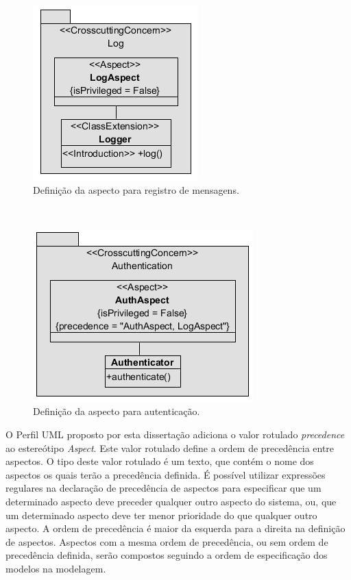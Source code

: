   \begin{figure}[!h]
	\centering
	\includegraphics{img/log_aspect.png}
	\caption{Definição da aspecto para registro de mensagens.}\label{fig:log_aspect}
  \end{figure}
  \
  \begin{figure}[!h]
	\centering
	\includegraphics{img/auth_aspect.png}
	\caption{Definição da aspecto para autenticação.}\label{fig:auth_aspect}
  \end{figure}

O Perfil UML proposto por esta dissertação adiciona o valor rotulado \textit{precedence} ao estereótipo \textit{Aspect}. Este valor rotulado define a
ordem de precedência entre aspectos. O tipo deste valor rotulado é um texto, que contém o nome dos aspectos os quais terão a precedência definida.
É possível utilizar expressões regulares na declaração de precedência de aspectos para especificar que um determinado aspecto deve preceder qualquer
outro aspecto do sistema, ou, que um determinado aspecto deve ter menor prioridade do que qualquer outro aspecto. A ordem de precedência é maior da
esquerda para a direita na definição de aspectos. Aspectos com a mesma ordem de precedência, ou sem ordem de precedência definida, serão compostos
seguindo a ordem de especificação dos modelos na modelagem.

